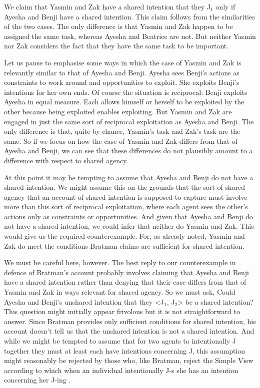 \documentclass[12pt,\papersize]{extarticle}
\begin{document}
We claim that Yasmin and Zak have a shared intention that they J$_1$
only if 
Ayesha and Benji have a shared intention. 
This claim follows from the similarities of the two cases.
The only difference is that Yasmin and Zak happen to be assigned the same task, whereas Ayesha and Beatrice are not.
But neither Yasmin nor Zak considers the fact that they have the same task to be important.

Let us pause to emphasise some ways in which the case of Yasmin and Zak is relevantly similar to that of  Ayesha and Benji. 
Ayesha sees Benji's actions as constraints to work around and opportunities to exploit.
She exploits Benji's intentions for her own ends.
Of course the situation is reciprocal: Benji exploits Ayesha in equal measure.
Each allows himself or herself to be exploited by the other because being exploited enables exploiting.
But Yasmin and Zak are engaged in just the same sort of reciprocal exploitation as Ayesha and Benji.
The only difference is that, quite by chance, Yasmin's task and Zak's task are the same.
So if we focus on how  
		the case of Yasmin and Zak
	differs from
		 that of Ayesha and Benji,
we can see that these differences do not plausibly amount to a difference with respect to shared agency.

At this point it may be tempting to assume that Ayesha and Benji do not have a shared intention. 
We might assume this on the grounds that
 the sort of shared agency that an account of shared intention is supposed to capture must involve more than this sort of reciprocal exploitation, where each agent sees the other's actions only as constraints or opportunities. 
And given that Ayesha and Benji do not have a shared intention,
	we could  infer that neither do Yasmin and Zak.
This would give us the required counterexample.
For, as already noted, Yasmin and Zak do meet the conditions Bratman claims are sufficient for shared intention.

We must be careful here, however.
The best reply to our counterexample in defence of Bratman's account probably involves claiming that Ayesha and Benji have a shared intention rather than denying that their case differs from that of Yasmin and Zak in ways relevant for shared agency.
So we must ask, 
Could Ayesha and Benji's unshared intention that they <J$_1$, J$_2$> be a  shared intention?
This question might initially appear frivolous but it is not straightforward to answer.
Since Bratman provides only sufficient conditions for shared intention, his account doesn't tell us that the unshared intention is not a shared intention.
And while we might be tempted to assume that for two agents to intentionally J together they must at least each have intentions concerning J, 
this assumption might reasonably be rejected by those who, like Bratman, reject the Simple View according to which when an individual intentionally J-s she has an intention concerning her J-ing \citep{Bratman:1984jr}.
\end{document}
